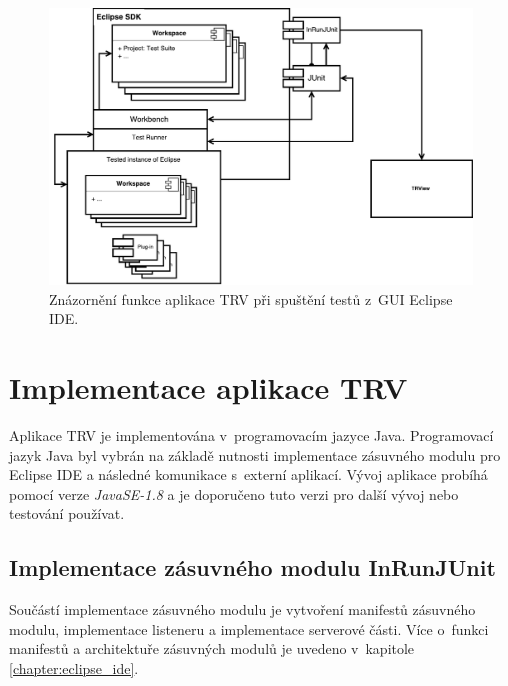     \begin{figure}
      \includegraphics[width=\textwidth, center]{obrazky-figures/TRV_run_from_gui.pdf}
      \caption{Znázornění funkce aplikace TRV při spuštění testů z~GUI Eclipse IDE.}
      \label{fig:TRV_run_from_gui}
    \end{figure}


  \section{Implementace aplikace TRV}
  Aplikace TRV je implementována v~programovacím jazyce Java. Programovací jazyk Java byl vybrán na základě nutnosti implementace zásuvného modulu pro Eclipse IDE a následné komunikace s~externí aplikací. Vývoj aplikace probíhá pomocí verze \emph{JavaSE-1.8} a je doporučeno tuto verzi pro další vývoj nebo testování používat.

    \subsection{Implementace zásuvného modulu InRunJUnit}
    Součástí implementace zásuvného modulu je vytvoření manifestů zásuvného modulu, implementace listeneru a implementace serverové části. Více o~funkci manifestů a architektuře zásuvných modulů je uvedeno v~kapitole \ref{chapter:eclipse_ide}.
      
